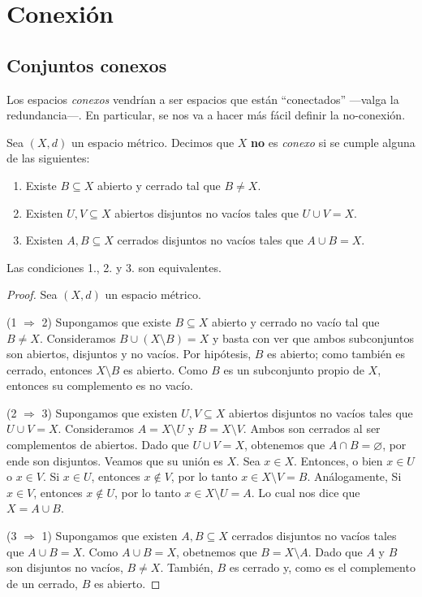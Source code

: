 \chapter{Conexión}

\section{Conjuntos conexos}

Los espacios \textit{conexos} vendrían a ser espacios que están ``conectados'' ---valga la redundancia---. En particular, se nos va a hacer más fácil definir la no-conexión.

\begin{definition}
	Sea $(X, d)$ un espacio métrico. Decimos que $X$ \textbf{no} es \emph{conexo} si se cumple alguna de las siguientes:
	\begin{enumerate}
		\item Existe $B \subseteq X$ abierto y cerrado tal que $B \neq X$.
		\item Existen $U, V \subseteq X$ abiertos disjuntos no vacíos tales que $U \cup V = X$.
		\item Existen $A, B \subseteq X$ cerrados disjuntos no vacíos tales que $A \cup B = X$.
	\end{enumerate}
\end{definition}

\begin{remark}
	Las condiciones 1., 2. y 3. son equivalentes.
\end{remark}

\begin{proof}
	Sea $(X, d)$ un espacio métrico.

	(1 $\Rightarrow$ 2) Supongamos que existe $B \subseteq X$ abierto y cerrado no vacío tal que $B \neq X$. Consideramos $B \cup (X \setminus B) = X$ y basta con ver que ambos subconjuntos son abiertos, disjuntos y no vacíos. Por hipótesis, $B$ es abierto; como también es cerrado, entonces $X \setminus B$ es abierto. Como $B$ es un subconjunto propio de $X$, entonces su complemento es no vacío.

	(2 $\Rightarrow$ 3) Supongamos que existen $U, V \subseteq X$ abiertos disjuntos no vacíos tales que $U \cup V = X$. Consideramos $A = X \setminus U$ y $B = X \setminus V$. Ambos son cerrados al ser complementos de abiertos. Dado que $U \cup V = X$, obtenemos que $A \cap B = \varnothing$, por ende son disjuntos. Veamos que su unión es $X$. Sea $x \in X$. Entonces, o bien $x \in U$ o $x \in V$. Si $x \in U$, entonces $x \not \in V$, por lo tanto $x \in X \setminus V = B$. Análogamente, Si $x \in V$, entonces $x \not \in U$, por lo tanto $x \in X \setminus U = A$. Lo cual nos dice que $X = A \cup B$.

	(3 $\Rightarrow$ 1) Supongamos que existen $A, B \subseteq X$ cerrados disjuntos no vacíos tales que $A \cup B = X$. Como $A \cup B = X$, obetnemos que $B = X \setminus A$. Dado que $A$ y $B$ son disjuntos no vacíos, $B \neq X$. También, $B$ es cerrado y, como es el complemento de un cerrado, $B$ es abierto.
\end{proof}

